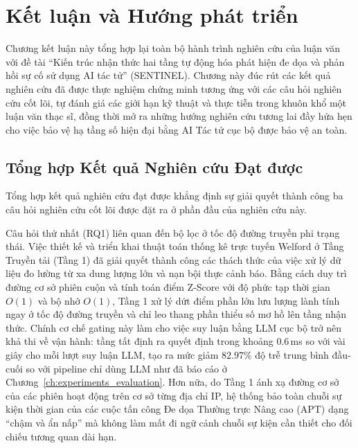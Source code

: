 \chapter{Kết luận và Hướng phát triển}
\label{ch:conclusion}

Chương kết luận này tổng hợp lại toàn bộ hành trình nghiên cứu của luận văn với đề tài ``Kiến trúc nhận thức hai tầng tự động hóa phát hiện đe dọa và phản hồi sự cố sử dụng AI tác tử'' (SENTINEL). Chương này đúc rút các kết quả nghiên cứu đã được thực nghiệm chứng minh tương ứng với các câu hỏi nghiên cứu cốt lõi, tự đánh giá các giới hạn kỹ thuật và thực tiễn trong khuôn khổ một luận văn thạc sĩ, đồng thời mở ra những hướng nghiên cứu tương lai đầy hứa hẹn cho việc bảo vệ hạ tầng số hiện đại bằng AI Tác tử cục bộ được bảo vệ an toàn.

\section{Tổng hợp Kết quả Nghiên cứu Đạt được}
Tổng hợp kết quả nghiên cứu đạt được khẳng định sự giải quyết thành công ba câu hỏi nghiên cứu cốt lõi được đặt ra ở phần đầu của nghiên cứu này.

Câu hỏi thứ nhất (RQ1) liên quan đến bộ lọc ở tốc độ đường truyền phi trạng thái. Việc thiết kế và triển khai thuật toán thống kê trực tuyến Welford ở Tầng Truyền tải (Tầng 1) đã giải quyết thành công các thách thức của việc xử lý dữ liệu đo lường từ xa dung lượng lớn và nạn bội thực cảnh báo. Bằng cách duy trì đường cơ sở phiên cuộn và tính toán điểm Z-Score với độ phức tạp thời gian $O(1)$ và bộ nhớ $O(1)$, Tầng 1 xử lý dứt điểm phần lớn lưu lượng lành tính ngay ở tốc độ đường truyền và chỉ leo thang phần thiểu số mơ hồ lên tầng nhận thức. Chính cơ chế gating này làm cho việc suy luận bằng LLM cục bộ trở nên khả thi về vận hành: tầng tất định ra quyết định trong khoảng $0.6$\,ms so với vài giây cho mỗi lượt suy luận LLM, tạo ra mức giảm $82.97\%$ độ trễ trung bình đầu-cuối so với pipeline chỉ dùng LLM như đã báo cáo ở Chương~\ref{ch:experiments_evaluation}. Hơn nữa, do Tầng 1 ánh xạ đường cơ sở của các phiên hoạt động trên cơ sở từng địa chỉ IP, hệ thống bảo toàn chuỗi sự kiện thời gian của các cuộc tấn công Đe dọa Thường trực Nâng cao (APT) dạng ``chậm và ẩn nấp'' mà không làm mất đi ngữ cảnh chuỗi sự kiện cần thiết cho đối chiếu tương quan dài hạn.

